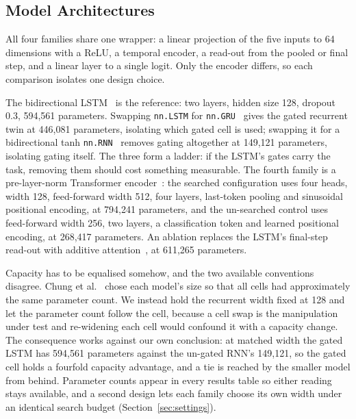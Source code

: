 \documentclass[mti,article,submit,moreauthors]{Definitions/mdpi}
\begin{document}
\subsection{Model Architectures}

All four families share one wrapper: a linear projection of the five inputs to 64 dimensions with a ReLU, a temporal encoder, a read-out from the pooled or final step, and a linear layer to a single logit. Only the encoder differs, so each comparison isolates one design choice.

The bidirectional LSTM~\citep{hochreiter1997lstm,schuster1997bilstm} is the reference: two layers, hidden size 128, dropout 0.3, 594,561 parameters. Swapping \texttt{nn.LSTM} for \texttt{nn.GRU}~\citep{cho2014gru,chung2014gru} gives the gated recurrent twin at 446,081 parameters, isolating which gated cell is used; swapping it for a bidirectional tanh \texttt{nn.RNN}~\citep{elman1990rnn,rumelhart1986backprop} removes gating altogether at 149,121 parameters, isolating gating itself. The three form a ladder: if the LSTM's gates carry the task, removing them should cost something measurable. The fourth family is a pre-layer-norm Transformer encoder~\citep{vaswani2017attention,xiong2020prelayernorm}: the searched configuration uses four heads, width 128, feed-forward width 512, four layers, last-token pooling and sinusoidal positional encoding, at 794,241 parameters, and the un-searched control uses feed-forward width 256, two layers, a classification token and learned positional encoding, at 268,417 parameters. An ablation replaces the LSTM's final-step read-out with additive attention~\citep{bahdanau2015attention}, at 611,265 parameters.

Capacity has to be equalised somehow, and the two available conventions disagree. Chung et al.~\citep{chung2014gru} chose each model's size so that all cells had approximately the same parameter count. We instead hold the recurrent width fixed at 128 and let the parameter count follow the cell, because a cell swap is the manipulation under test and re-widening each cell would confound it with a capacity change. The consequence works against our own conclusion: at matched width the gated LSTM has 594,561 parameters against the un-gated RNN's 149,121, so the gated cell holds a fourfold capacity advantage, and a tie is reached by the smaller model from behind. Parameter counts appear in every results table so either reading stays available, and a second design lets each family choose its own width under an identical search budget (Section~\ref{sec:settings}).
\end{document}

